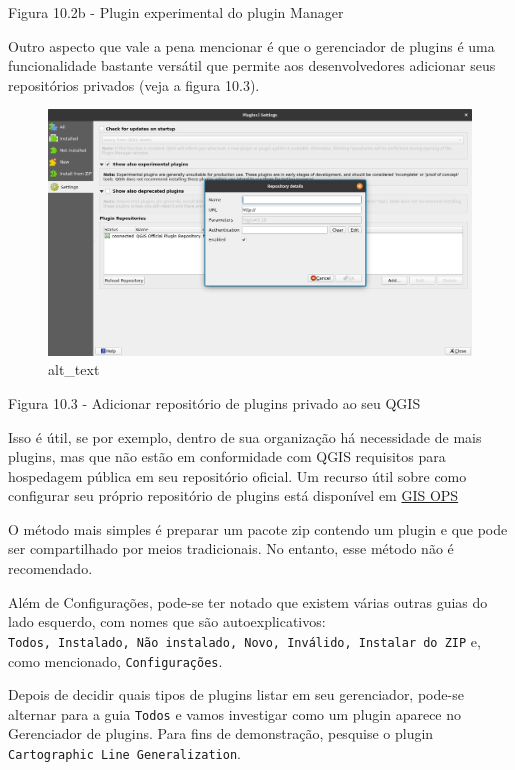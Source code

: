 \documentclass[
  portuguese,
]{krantz}
\begin{document}
Figura 10.2b - Plugin experimental do plugin Manager

Outro aspecto que vale a pena mencionar é que o gerenciador de plugins é uma funcionalidade bastante versátil que permite aos desenvolvedores adicionar seus repositórios privados (veja a figura 10.3).

\begin{figure}
\centering
\includegraphics{media/modulo10/fig103.png}
\caption{alt\_text}
\end{figure}

Figura 10.3 - Adicionar repositório de plugins privado ao seu QGIS

Isso é útil, se por exemplo, dentro de sua organização há necessidade de mais plugins, mas que não estão em conformidade com QGIS requisitos para hospedagem pública em seu repositório oficial. Um recurso útil sobre como configurar seu próprio repositório de plugins está disponível em \href{https://gis-ops.com/qgis-3-plugin-tutorial-set-up-a-plugin-repository-explained/}{GIS OPS}

O método mais simples é preparar um pacote zip contendo um plugin e que pode ser compartilhado por meios tradicionais. No entanto, esse método não é recomendado.

Além de Configurações, pode-se ter notado que existem várias outras guias do lado esquerdo, com nomes que são autoexplicativos: \texttt{Todos,\ Instalado,\ Não\ instalado,\ Novo,\ Inválido,\ Instalar\ do\ ZIP} e, como mencionado, \texttt{Configurações}.

Depois de decidir quais tipos de plugins listar em seu gerenciador, pode-se alternar para a guia \texttt{Todos} e vamos investigar como um plugin aparece no Gerenciador de plugins. Para fins de demonstração, pesquise o plugin \texttt{Cartographic\ Line\ Generalization}.
\end{document}
